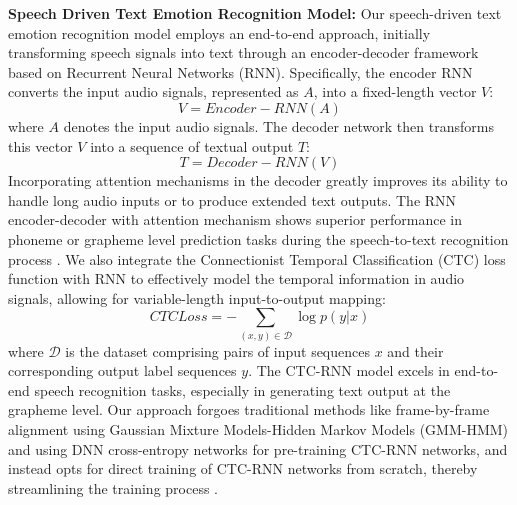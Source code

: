 \documentclass[preprint,12pt]{elsarticle}
\begin{document}
\textbf{Speech Driven Text Emotion Recognition Model:} Our speech-driven text emotion recognition model employs an end-to-end approach, initially transforming speech signals into text through an encoder-decoder framework based on Recurrent Neural Networks (RNN). Specifically, the encoder RNN converts the input audio signals, represented as \( A \), into a fixed-length vector \( V \):
\begin{equation}
V = Encoder-RNN(A)
\end{equation}
where \( A \) denotes the input audio signals. The decoder network then transforms this vector \( V \) into a sequence of textual output \( T \):
\begin{equation}
T = Decoder - RNN(V)
\end{equation}
Incorporating attention mechanisms in the decoder greatly improves its ability to handle long audio inputs or to produce extended text outputs. The RNN encoder-decoder with attention mechanism shows superior performance in phoneme or grapheme level prediction tasks during the speech-to-text recognition process \cite{ref34}. We also integrate the Connectionist Temporal Classification (CTC) loss function with RNN to effectively model the temporal information in audio signals, allowing for variable-length input-to-output mapping:
\begin{equation}
CTC Loss = -\sum_{(x,y)\in \mathcal{D}} \log p(y|x)
\end{equation}
where \( \mathcal{D} \) is the dataset comprising pairs of input sequences \( x \) and their corresponding output label sequences \( y \). The CTC-RNN model excels in end-to-end speech recognition tasks, especially in generating text output at the grapheme level. Our approach forgoes traditional methods like frame-by-frame alignment using Gaussian Mixture Models-Hidden Markov Models (GMM-HMM) and using DNN cross-entropy networks for pre-training CTC-RNN networks, and instead opts for direct training of CTC-RNN networks from scratch, thereby streamlining the training process \cite{ref35}.
\end{document}
